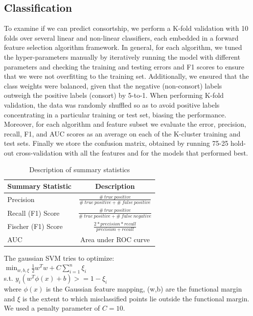 \documentclass[twoside,twocolumn,paper=letter,fontsize=11pt]{article}
\begin{document}
\subsection{Classification}
To examine if we can predict consortship, we perform a K-fold validation with 10
folds over several linear and non-linear classifiers, each embedded in a forward
feature selection algorithm framework. In general, for each algorithm, we tuned
the hyper-parameters manually by iteratively running the model with different
parameters and checking the training and testing errors and F1 scores to ensure
that we were not overfitting to the training set.  Additionally, we ensured that
the class weights were balanced, given that the negative (non-consort) labels
outweigh the positive labels (consort) by 5-to-1. When performing K-fold
validation, the data was randomly shuffled so as to avoid positive labels
concentrating in a particular training or test set, biasing the performance.
Moreover, for each algorithm and feature subset we evaluate the error,
precision, recall, F1, and AUC scores as an average on
each of the K-cluster training and test sets.  Finally we store the confusion
matrix, obtained by running 75-25 hold-out cross-validation with all the
features and for the models that performed best.
\begin{table}[h]
  \centering
  \begin{tabular}{|l|c|}
    \hline
    Summary Statistic & Description \\
    \hline
    Precision&
    $\frac{\#\ true\ positive}{\#\ true\ positive + \#\ false\ positive}$\\
    \hline
    Recall (F1) Score &
    $\frac{\#\ true\ positive}{\#\ true\ positive + \#\ false\ negative}$\\
    \hline
    Fischer (F1) Score &
    $\frac{2* precision* recall}{{precision}+{recall}}$\\
    \hline
    AUC &
    Area under ROC curve \\
    \hline
  \end{tabular}
  \caption{Description of summary statistics}
  \label{tbl:sum_stats}
\end{table}

 The gaussian SVM tries to optimize: \\
 $ \min_{w,b,\xi} \frac{1}{2} w^Tw + C \sum_{i=1}^{n} \xi_i$\\ s.t. $ y_i(w^T\phi(x) + b) >= 1-\xi_i$\\ where $\phi(x)$ is the Gaussian feature mapping, (w,b) are the functional margin and $\xi$ is the extent to which misclassified points lie outside the functional margin.
We used a penalty parameter of $C=10$.\\
\end{document}
